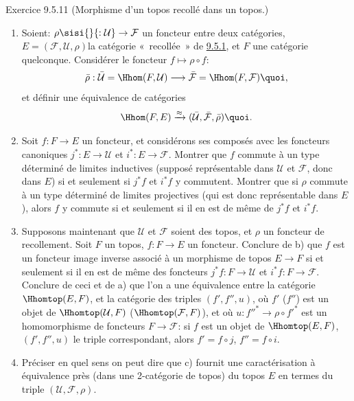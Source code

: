 \documentclass[10pt]{../fichiers-configuration-latex/smfart}
\begin{document}
\begin{enonce*}[remark]{Exercice 9.5.11}
(Morphisme d'un topos recollé dans un topos.)
\begin{enumerate}
\renewcommand{\theenumi}{\alph{enumi}}
\renewcommand{\labelenumi}{\theenumi)}
\item Soient: $\rho \sisi{}{: \mathcal{U}} \rightarrow \mathcal{F}$ un foncteur entre deux
catégories, $E=(\mathcal{F},\mathcal{U},\rho)$\pageoriginale la
catégorie « recollée »  de \hyperref[IV.subsubsec9.5.1]{9.5.1}, et $F$ une
catégorie quelconque. Considérer le foncteur $f\mapsto \rho\circ f$:
$$
\bar{\rho}:\bar{\mathcal{U}}=\Hhom(F,\mathcal{U})\longrightarrow
\bar{\mathcal{F}}=\Hhom(F,\mathcal{F}){\quoi},
$$
et définir une équivalence de catégories
$$
\Hhom(F,E)\xrightarrow{\approx}(\bar{\mathcal{U}},\bar{\mathcal{F}},\bar{\rho}){\quoi}.
$$

\item Soit $f:F\rightarrow E$ un foncteur, et considérons ses composés
avec les foncteurs canoniques $j^{\ast}:E\rightarrow \mathcal{U}$ et
$i^{\ast}:E\rightarrow \mathcal{F}$. Montrer que $f$ commute à un
type déterminé de limites inductives (supposé représentable dans
$\mathcal{U}$ et $\mathcal{F}$, donc dans $E$) si et seulement si
$j^{\ast}f$ et $i^{\ast}f$ y commutent. Montrer que si $\rho$
commute à un type déterminé de limites projectives (qui est donc
représentable dans $E$), alors $f$ y commute si et seulement si il
en est de même de $j^{\ast}f$ et $i^{\ast}f$.

\item Supposons maintenant que $\mathcal{U}$ et $\mathcal{F}$ soient
  des topos, et
$\rho$ un foncteur de recollement. Soit $F$ un topos,
$f:F\rightarrow E$ un foncteur. Conclure de b) que $f$ est un
foncteur image inverse associé à un morphisme de topos $E\rightarrow
F$ si et seulement si il en est de même des foncteurs
$j^{\ast}f:F\rightarrow \mathcal{U}$ et $i^{\ast}f:F\rightarrow
\mathcal{F}$. Conclure de ceci et de a) que l'on a une équivalence
entre la catégorie $\Hhomtop(E,F)$, et la catégorie des triples
$(f',f'',u)$, où $f'$ (\resp $f''$) est un objet de
$\Hhomtop(\mathcal{U}, F)$ (\resp $\Hhomtop(\mathcal{F}, F)$), et où
$u:{f''}^{\ast}\rightarrow \rho\circ {f'}^{\ast}$ est un
homomorphisme de foncteurs $F\rightarrow \mathcal{F}$: si $f$ est un
objet de $\Hhomtop(E,F)$, $(f',f'',u)$ le triple correspondant,
alors $f'=f\circ j$, $f''=f\circ i$.

\item Préciser en quel sens on peut dire que c) fournit une
caractérisation à équivalence près (dans une 2-catégorie de topos)
du topos $E$ en termes du triple $(\mathcal{U},\mathcal{F},\rho)$.
\end{enumerate}
\end{enonce*}
\end{document}
